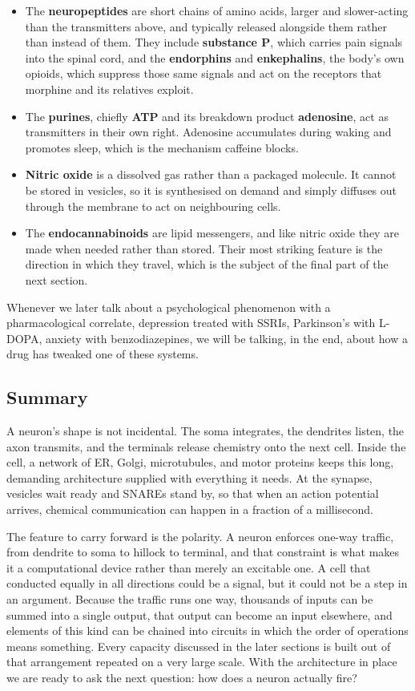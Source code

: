 \documentclass[11pt]{article}
\begin{document}
\begin{itemize}
    \item The \textbf{neuropeptides} are short chains of amino acids, larger and slower-acting than the transmitters above, and typically released alongside them rather than instead of them. They include \textbf{substance P}, which carries pain signals into the spinal cord, and the \textbf{endorphins} and \textbf{enkephalins}, the body's own opioids, which suppress those same signals and act on the receptors that morphine and its relatives exploit.
    \item The \textbf{purines}, chiefly \textbf{ATP} and its breakdown product \textbf{adenosine}, act as transmitters in their own right. Adenosine accumulates during waking and promotes sleep, which is the mechanism caffeine blocks.
    \item \textbf{Nitric oxide} is a dissolved gas rather than a packaged molecule. It cannot be stored in vesicles, so it is synthesised on demand and simply diffuses out through the membrane to act on neighbouring cells.
    \item The \textbf{endocannabinoids} are lipid messengers, and like nitric oxide they are made when needed rather than stored. Their most striking feature is the direction in which they travel, which is the subject of the final part of the next section.
\end{itemize}

Whenever we later talk about a psychological phenomenon with a pharmacological correlate, depression treated with SSRIs, Parkinson's with L-DOPA, anxiety with benzodiazepines, we will be talking, in the end, about how a drug has tweaked one of these systems.

\subsection{Summary}

A neuron's shape is not incidental. The soma integrates, the dendrites listen, the axon transmits, and the terminals release chemistry onto the next cell. Inside the cell, a network of ER, Golgi, microtubules, and motor proteins keeps this long, demanding architecture supplied with everything it needs. At the synapse, vesicles wait ready and SNAREs stand by, so that when an action potential arrives, chemical communication can happen in a fraction of a millisecond.

The feature to carry forward is the polarity. A neuron enforces one-way traffic, from dendrite to soma to hillock to terminal, and that constraint is what makes it a computational device rather than merely an excitable one. A cell that conducted equally in all directions could be a signal, but it could not be a step in an argument. Because the traffic runs one way, thousands of inputs can be summed into a single output, that output can become an input elsewhere, and elements of this kind can be chained into circuits in which the order of operations means something. Every capacity discussed in the later sections is built out of that arrangement repeated on a very large scale. With the architecture in place we are ready to ask the next question: how does a neuron actually fire?
\end{document}
